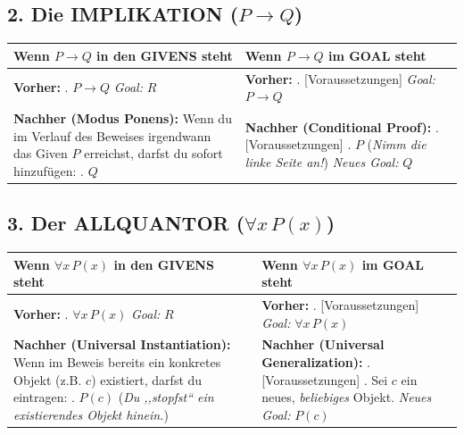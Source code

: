 \documentclass{article}
\begin{document}
\subsection*{2. Die IMPLIKATION ($P \rightarrow Q$)}
\begin{center}
\small
\begin{tabular}{ L{0.45\textwidth} | L{0.45\textwidth} }
\toprule
\textbf{Wenn $P \rightarrow Q$ in den GIVENS steht} & \textbf{Wenn $P \rightarrow Q$ im GOAL steht} \\
\midrule
\textbf{Vorher:} . $P \rightarrow Q$ \newline
\emph{Goal:} $R$ &
\textbf{Vorher:} . [Voraussetzungen] \newline
\emph{Goal:} $P \rightarrow Q$ \\
\hline
\textbf{Nachher (Modus Ponens):} \newline
Wenn du im Verlauf des Beweises irgendwann das Given $P$ erreichst, darfst du sofort hinzufügen: . $Q$ &
\textbf{Nachher (Conditional Proof):} . [Voraussetzungen] . $P$ (\emph{Nimm die linke Seite an!}) \newline
\emph{Neues Goal:} $Q$ \\
\bottomrule
\end{tabular}
\end{center}

\subsection*{3. Der ALLQUANTOR ($\forall x \, P(x)$)}
\begin{center}
\small
\begin{tabular}{ L{0.45\textwidth} | L{0.45\textwidth} }
\toprule
\textbf{Wenn $\forall x \, P(x)$ in den GIVENS steht} & \textbf{Wenn $\forall x \, P(x)$ im GOAL steht} \\
\midrule
\textbf{Vorher:} . $\forall x \, P(x)$ \newline
\emph{Goal:} $R$ &
\textbf{Vorher:} . [Voraussetzungen] \newline
\emph{Goal:} $\forall x \, P(x)$ \\
\hline
\textbf{Nachher (Universal Instantiation):} \newline
Wenn im Beweis bereits ein konkretes Objekt (z.B. $c$) existiert, darfst du eintragen: . $P(c)$ \newline
(\emph{Du ,,stopfst`` ein existierendes Objekt hinein.}) &
\textbf{Nachher (Universal Generalization):} . [Voraussetzungen] . Sei $c$ ein neues, \emph{beliebiges} Objekt. \newline
\emph{Neues Goal:} $P(c)$ \\
\bottomrule
\end{tabular}
\end{center}
\end{document}
